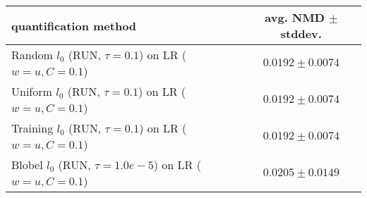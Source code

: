 \begin{tabular}{lc}
  \toprule
  quantification method & avg. NMD $\pm$ stddev. \\
  \midrule
  Random $l_0$ (RUN, $\tau=0.1$) on LR ($w=u, C=0.1$) & $\mathbf{0.0192 \pm 0.0074}$ \\
  Uniform $l_0$ (RUN, $\tau=0.1$) on LR ($w=u, C=0.1$) & $\mathbf{0.0192 \pm 0.0074}$ \\
  Training $l_0$ (RUN, $\tau=0.1$) on LR ($w=u, C=0.1$) & $0.0192 \pm 0.0074$ \\
  Blobel $l_0$ (RUN, $\tau=1.0e-5$) on LR ($w=u, C=0.1$) & $0.0205 \pm 0.0149$ \\
  \bottomrule
\end{tabular}
